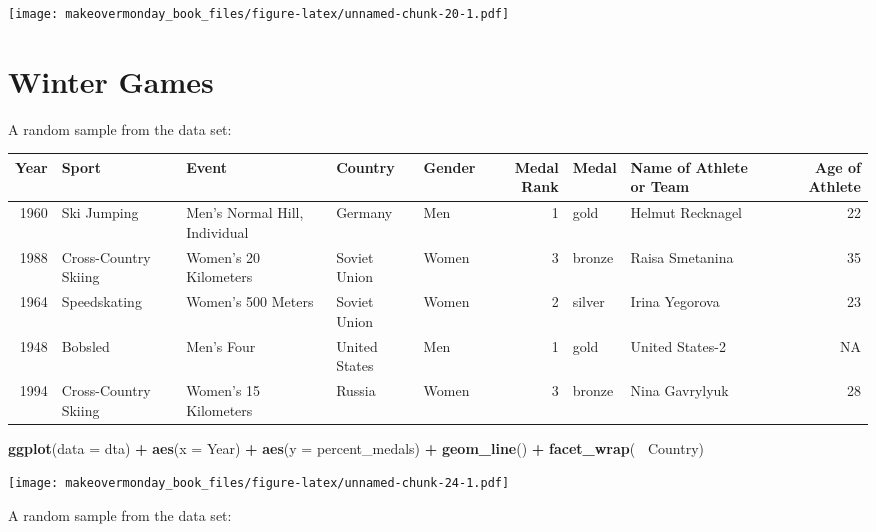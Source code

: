 \documentclass[]{book}
\newenvironment{Shaded}{\begin{snugshade}}{\end{snugshade}}
\newcommand{\KeywordTok}[1]{\textcolor[rgb]{0.13,0.29,0.53}{\textbf{#1}}}
\newcommand{\DataTypeTok}[1]{\textcolor[rgb]{0.13,0.29,0.53}{#1}}
\newcommand{\StringTok}[1]{\textcolor[rgb]{0.31,0.60,0.02}{#1}}
\newcommand{\OperatorTok}[1]{\textcolor[rgb]{0.81,0.36,0.00}{\textbf{#1}}}
\newcommand{\NormalTok}[1]{#1}
\theoremstyle{definition}
\theoremstyle{definition}
\theoremstyle{definition}
\theoremstyle{remark}
\begin{document}
\texttt{[image: makeovermonday\_book\_files/figure-latex/unnamed-chunk-20-1.pdf]}

\chapter{Winter Games}\label{winter-games}

A random sample from the data set:

\begin{tabular}{r|l|l|l|l|r|l|l|r}
\hline
Year & Sport & Event & Country & Gender & Medal Rank & Medal & Name of Athlete or Team & Age of Athlete\\
\hline
1960 & Ski Jumping & Men's Normal Hill, Individual & Germany & Men & 1 & gold & Helmut Recknagel & 22\\
\hline
1988 & Cross-Country Skiing & Women's 20 Kilometers & Soviet Union & Women & 3 & bronze & Raisa Smetanina & 35\\
\hline
1964 & Speedskating & Women's 500 Meters & Soviet Union & Women & 2 & silver & Irina Yegorova & 23\\
\hline
1948 & Bobsled & Men's Four & United States & Men & 1 & gold & United States-2 & NA\\
\hline
1994 & Cross-Country Skiing & Women's 15 Kilometers & Russia & Women & 3 & bronze & Nina Gavrylyuk & 28\\
\hline
\end{tabular}

\begin{Shaded}
\begin{Highlighting}[]
\KeywordTok{ggplot}\NormalTok{(}\DataTypeTok{data =}\NormalTok{ dta) }\OperatorTok{+}\StringTok{ }
\StringTok{  }\KeywordTok{aes}\NormalTok{(}\DataTypeTok{x =}\NormalTok{ Year) }\OperatorTok{+}
\StringTok{  }\KeywordTok{aes}\NormalTok{(}\DataTypeTok{y =}\NormalTok{ percent_medals) }\OperatorTok{+}
\StringTok{  }\KeywordTok{geom_line}\NormalTok{() }\OperatorTok{+}\StringTok{ }
\StringTok{  }\KeywordTok{facet_wrap}\NormalTok{(}\OperatorTok{~}\StringTok{ }\NormalTok{Country)}
\end{Highlighting}
\end{Shaded}

\texttt{[image: makeovermonday\_book\_files/figure-latex/unnamed-chunk-24-1.pdf]}

A random sample from the data set:
\end{document}

